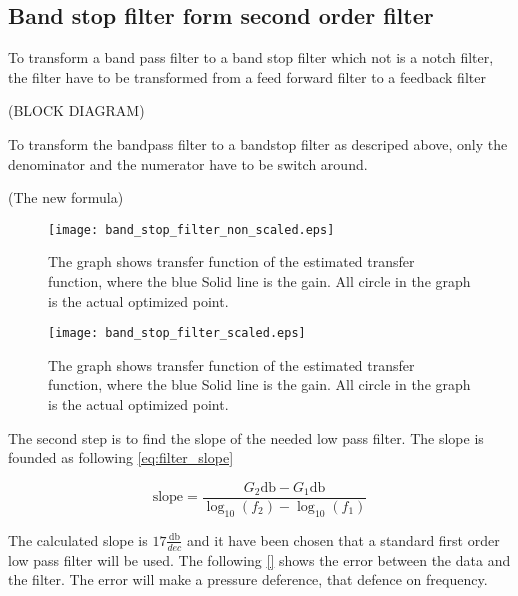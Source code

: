 \subsection{Band stop filter form second order filter}
To transform a band pass filter to a band stop filter which not is a notch filter, the filter have to be transformed from a feed forward filter to a feedback filter 


(BLOCK DIAGRAM)

To transform the bandpass filter to a bandstop filter as descriped above, only the denominator and the numerator have to be switch around.

(The new formula)


\begin{figure}[H]
	\centering
	\texttt{[image: band\_stop\_filter\_non\_scaled.eps]}
	\caption{The graph shows transfer function of the estimated transfer function, where the blue  Solid line is the gain. All circle in the graph is the actual optimized point.}
		\label{fig:band_stop_filter_non_scaled}
\end{figure}


\begin{figure}[H]
	\centering
	\texttt{[image: band\_stop\_filter\_scaled.eps]}
	\caption{The graph shows transfer function of the estimated transfer function, where the blue  Solid line is the gain. All circle in the graph is the actual optimized point.}
		\label{fig:band_stop_filter_scaled}
\end{figure}


 The second step is to find the slope of the needed low pass filter. The slope is founded as following \autoref{eq:filter_slope}

\begin{equation}
\text{slope} = \frac{G_2\si{\decibel}-G_1\si{\decibel}}{\log_{10}{(f_2)}-\log_{10}{(f_1)}}
\end{equation}

    \startexplain
    \stopexplain
    
The calculated slope is $17 \frac{\si{\decibel}}{dec}$ and it have been chosen that a standard first order low pass filter will be used. The following \autoref{} shows the error between the data and the filter. The error will make a pressure deference, that defence on frequency. 


